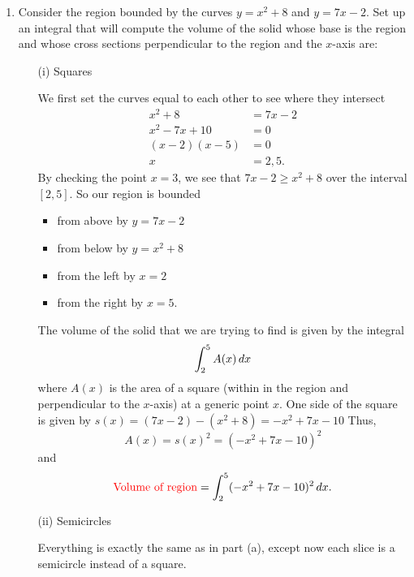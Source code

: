 \documentclass[noinstructornotes]{ximera}
\begin{document}
\begin{problem}
	\begin{enumerate}
		\item  Consider the region bounded by the curves $y=x^2+8$ and $y=7x-2$.  
		Set up an integral that will compute the volume of the solid whose base is the region and whose cross sections perpendicular to the region and the $x$-axis are:
			\begin{enumerate}
				\item[(i)]  Squares
				\begin{freeResponse}
				We first set the curves equal to each other to see where they intersect
					\begin{align*}
					x^2 + 8 &= 7x - 2  \\
					x^2 - 7x + 10 &= 0  \\
					(x-2)(x-5) &= 0  \\
					x &= 2,5.
					\end{align*}
				By checking the point $x=3$, we see that $7x-2 \geq x^2+8$ over the interval $[2,5]$.  
				So our region is bounded
					\begin{itemize}
					\item  from above by $y=7x-2$
					\item  from below by $y=x^2+8$
					\item  from the left by  $x=2$
					\item  from the right by $x=5$.
					\end{itemize}
								
				The volume of the solid that we are trying to find is given by the integral
				\[
				\int_2^5 A(x) \,d x
				\]
				where $A(x)$ is the area of a square (within in the region and perpendicular to the $x$-axis) at a generic point $x$.  
				One side of the square is given by $s(x) = (7x-2) - (x^2+8) = -x^2 + 7x -10$ 
				Thus,
				\[
				A(x) = s(x)^2 = (-x^2+7x-10)^2
				\]
				and
				\[
				\text{{\color{red} Volume of region}} = \int_2^5 (-x^2+7x-10)^2 \,d x .
				\]
				
				\end{freeResponse}
				
				\item[(ii)]  Semicircles
				\begin{freeResponse}
				Everything is exactly the same as in part (a), except now each slice is a semicircle instead of a square.
  

\end{freeResponse}
\end{enumerate}
\end{enumerate}
\end{problem}
\end{document}
